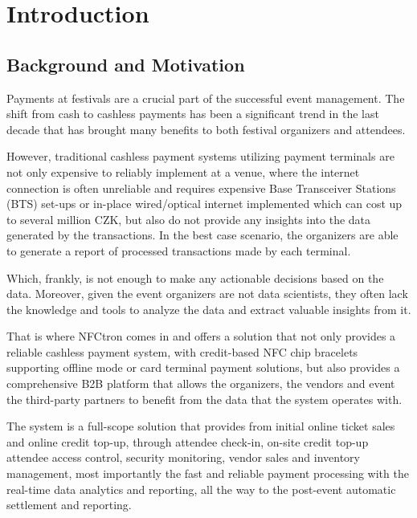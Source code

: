 \chapter*{Introduction}
\label{chap:introduction}


\section*{Background and Motivation}
\label{sec:introduction-background-motivation}
Payments at festivals are a crucial part of the successful event management.
The shift from cash to cashless payments has been a significant trend in the last decade that has brought many benefits to both festival organizers and attendees.

However, traditional cashless payment systems utilizing payment terminals are not only expensive to reliably implement at a venue, where the internet connection is often unreliable and requires expensive Base Transceiver Stations (BTS) set-ups or in-place wired/optical internet implemented which can cost up to several million CZK, but also do not provide any insights into the data generated by the transactions.
In the best case scenario, the organizers are able to generate a report of processed transactions made by each terminal.

Which, frankly, is not enough to make any actionable decisions based on the data.
Moreover, given the event organizers are not data scientists, they often lack the knowledge and tools to analyze the data and extract valuable insights from it.

That is where NFCtron comes in and offers a solution that not only provides a reliable cashless payment system, with credit-based NFC chip bracelets supporting offline mode or card terminal payment solutions, but also provides a comprehensive B2B platform that allows the organizers, the vendors and event the third-party partners to benefit from the data that the system operates with.

The system is a full-scope solution that provides from initial online ticket sales and online credit top-up, through attendee check-in, on-site credit top-up attendee access control, security monitoring, vendor sales and inventory management, most importantly the fast and reliable payment processing with the real-time data analytics and reporting, all the way to the post-event automatic settlement and reporting.

